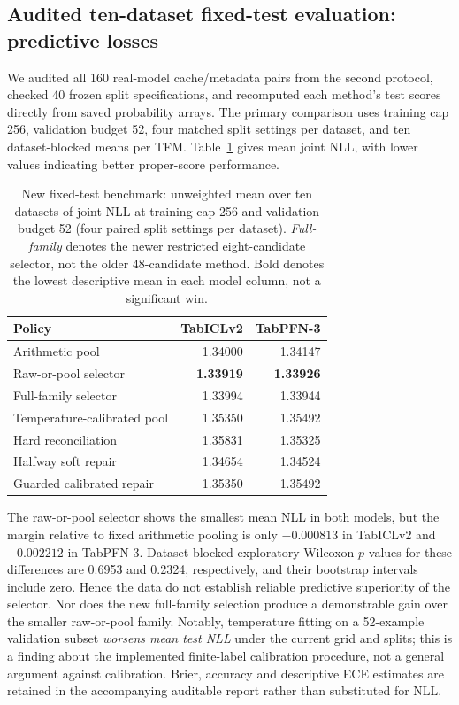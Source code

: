 \documentclass[a4paper,fleqn]{cas-sc}
\begin{document}
\subsection{Audited ten-dataset fixed-test evaluation: predictive losses}
\label{sec:newprimary}
We audited all 160 real-model cache/metadata pairs from the second protocol, checked 40 frozen split specifications, and recomputed each method's test scores directly from saved probability arrays. The primary comparison uses training cap 256, validation budget 52, four matched split settings per dataset, and ten dataset-blocked means per TFM. Table~\ref{tab:newprimary} gives mean joint NLL, with lower values indicating better proper-score performance.

\begin{table}[t]
\centering
\caption{New fixed-test benchmark: unweighted mean over ten datasets of joint NLL at training cap 256 and validation budget 52 (four paired split settings per dataset). \emph{Full-family} denotes the newer restricted eight-candidate selector, not the older 48-candidate method. Bold denotes the lowest descriptive mean in each model column, not a significant win.}
\label{tab:newprimary}
\begin{tabular}{lrr}
\toprule
Policy & TabICLv2 & TabPFN-3\\
\midrule
Arithmetic pool & 1.34000 & 1.34147\\
Raw-or-pool selector & \textbf{1.33919} & \textbf{1.33926}\\
Full-family selector & 1.33994 & 1.33944\\
Temperature-calibrated pool & 1.35350 & 1.35492\\
Hard reconciliation & 1.35831 & 1.35325\\
Halfway soft repair & 1.34654 & 1.34524\\
Guarded calibrated repair & 1.35350 & 1.35492\\
\bottomrule
\end{tabular}
\end{table}

The raw-or-pool selector shows the smallest mean NLL in both models, but the margin relative to fixed arithmetic pooling is only $-0.000813$ in TabICLv2 and $-0.002212$ in TabPFN-3. Dataset-blocked exploratory Wilcoxon $p$-values for these differences are 0.6953 and 0.2324, respectively, and their bootstrap intervals include zero. Hence the data do not establish reliable predictive superiority of the selector. Nor does the new full-family selection produce a demonstrable gain over the smaller raw-or-pool family. Notably, temperature fitting on a 52-example validation subset \emph{worsens mean test NLL} under the current grid and splits; this is a finding about the implemented finite-label calibration procedure, not a general argument against calibration. Brier, accuracy and descriptive ECE estimates are retained in the accompanying auditable report rather than substituted for NLL.
\end{document}
